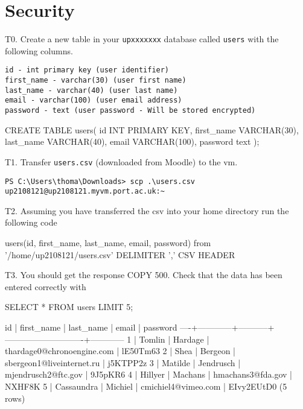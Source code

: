 
\section*{Security}
T0. Create a new table in your \verb|upxxxxxxx| database called \verb|users| with the following columns.
\begin{verbatim}
id - int primary key (user identifier)
first_name - varchar(30) (user first name)
last_name - varchar(40) (user last name)
email - varchar(100) (user email address)
password - text (user password - Will be stored encrypted)
\end{verbatim}
\begin{sql}
CREATE TABLE users(
    id INT PRIMARY KEY,
    first_name VARCHAR(30),
    last_name VARCHAR(40),
    email VARCHAR(100),
    password text
);
\end{sql}

T1. Transfer \verb|users.csv| (downloaded from Moodle) to the vm.
\begin{verbatim}
PS C:\Users\thoma\Downloads> scp .\users.csv up2108121@up2108121.myvm.port.ac.uk:~
\end{verbatim}

T2. Assuming you have transferred the csv into your home directory run the following code
\begin{pseudo}
\copy users(id, first_name, last_name, email, password) from '/home/up2108121/users.csv' DELIMITER ',' CSV HEADER
\end{pseudo}

T3. You should get the response COPY 500. Check that the data has been entered correctly with 
\begin{sql}
SELECT * FROM users LIMIT 5;
\end{sql}
\begin{pseudo}
 id | first_name | last_name |           email            |  password
----+------------+-----------+----------------------------+------------
  1 | Tomlin     | Hardage   | thardage0@chronoengine.com | lE50Tm63
  2 | Shea       | Bergeon   | sbergeon1@liveinternet.ru  | j5KTPP2z
  3 | Matilde    | Jendrusch | mjendrusch2@ftc.gov        | 9J5pKR6
  4 | Hillyer    | Machans   | hmachans3@fda.gov          | NXHF8K
  5 | Cassaundra | Michiel   | cmichiel4@vimeo.com        | EIvy2EUtD0
(5 rows)
\end{pseudo}

